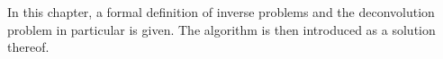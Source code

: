 In this chapter,
  a formal definition of
    inverse problems
    and the deconvolution problem in particular
  is given.
The \dsea algorithm is then introduced
  as a solution thereof.

